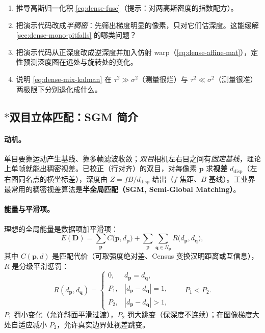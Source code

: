 \begin{practice}[练习]
\begin{enumerate}
  \item 推导高斯归一化积 \cref{eq:dense-fuse}（提示：对两高斯密度的指数配方）。
  \item 把演示代码改成\emph{半稠密}：先筛出梯度明显的像素，只对它们估深度。这能缓解 \cref{sec:dense-mono-pitfalls} 的哪类问题？
  \item 把演示代码从正深度改成逆深度并加入仿射 warp（\cref{eq:dense-affine-mat}），定性预测深度图在远处与旋转处的变化。
  \item 说明 \cref{eq:dense-mix-kalman} 在 $\tau^2\gg\sigma^2$（测量很烂）与 $\tau^2\ll\sigma^2$（测量很准）两极限下分别退化成什么。
\end{enumerate}
\end{practice}

\subsection{\texorpdfstring{$*$}{*}双目立体匹配：SGM 简介}
\label{sec:dense-sgm}

\paragraph{动机。}
单目要靠运动产生基线、靠多帧滤波收敛；\emph{双目}相机左右目之间有\emph{固定基线}，理论上单帧就能出稠密视差。已校正（行对齐）的双目，对每像素 $\mathbf{p}$ 求\textbf{视差} $d_{\mathrm{disp}}$（左右图同名点的横坐标差），深度由 $Z=fB/d_{\mathrm{disp}}$ 给出（$f$ 焦距、$B$ 基线）。工业界最常用的稠密视差算法是\textbf{半全局匹配（SGM, Semi-Global Matching）}\cite{hirschmuller2008sgm}。

\paragraph{能量与平滑项。}
理想的全局能量是数据项加平滑项：
\begin{equation}
  E(\mathbf{D})=\sum_{\mathbf{p}}C\!\bigl(\mathbf{p},d_{\mathbf{p}}\bigr)
   +\sum_{\mathbf{p}}\sum_{\mathbf{q}\in N_{\mathbf{p}}}R\!\bigl(d_{\mathbf{p}},d_{\mathbf{q}}\bigr),
  \label{eq:dense-sgm-energy}
\end{equation}
其中 $C(\mathbf{p},d)$ 是匹配代价（可取强度绝对差、Census 变换汉明距离或互信息），$R$ 是分级平滑惩罚：
\begin{equation}
  R(d_{\mathbf{p}},d_{\mathbf{q}})=\begin{cases}0,&d_{\mathbf{p}}=d_{\mathbf{q}},\\ P_1,&|d_{\mathbf{p}}-d_{\mathbf{q}}|=1,\\ P_2,&|d_{\mathbf{p}}-d_{\mathbf{q}}|>1,\end{cases}
  \qquad P_1<P_2.
  \label{eq:dense-sgm-smooth}
\end{equation}
$P_1$ 罚小变化（允许斜面平滑过渡），$P_2$ 罚大跳变（保深度不连续）；在图像梯度大处自适应减小 $P_2$，允许真实边界处视差跳变。

